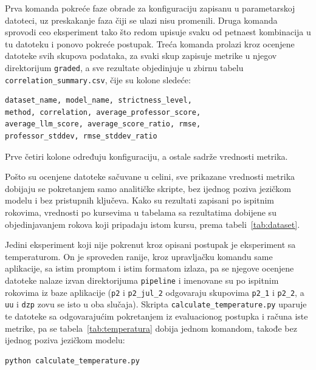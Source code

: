 Prva komanda pokreće faze obrade za konfiguraciju zapisanu u parametarskoj datoteci,
uz preskakanje faza čiji se ulazi nisu promenili.
Druga komanda sprovodi ceo eksperiment tako što redom upisuje
svaku od petnaest kombinacija u tu datoteku i ponovo pokreće postupak.
Treća komanda prolazi kroz ocenjene datoteke svih skupova podataka,
za svaki skup zapisuje metrike u njegov direktorijum \texttt{graded},
a sve rezultate objedinjuje u zbirnu tabelu \texttt{correlation\_summary.csv},
čije su kolone sledeće:

\begin{tcolorbox}[promptbox, title={Kolone zbirne tabele}]
\begin{verbatim}
dataset_name, model_name, strictness_level,
method, correlation, average_professor_score,
average_llm_score, average_score_ratio, rmse,
professor_stddev, rmse_stddev_ratio
\end{verbatim}
\end{tcolorbox}

Prve četiri kolone određuju konfiguraciju, a ostale sadrže vrednosti metrika.

Pošto su ocenjene datoteke sačuvane u celini,
sve prikazane vrednosti metrika dobijaju se pokretanjem samo analitičke skripte,
bez ijednog poziva jezičkom modelu i bez pristupnih ključeva.
Kako su rezultati zapisani po ispitnim rokovima,
vrednosti po kursevima u tabelama sa rezultatima
dobijene su objedinjavanjem rokova koji pripadaju istom kursu,
prema tabeli~\ref{tab:dataset}.

Jedini eksperiment koji nije pokrenut kroz opisani postupak je eksperiment sa temperaturom.
On je sproveden ranije, kroz upravljačku komandu same aplikacije,
sa istim promptom i istim formatom izlaza,
pa se njegove ocenjene datoteke nalaze izvan direktorijuma \texttt{pipeline}
i imenovane su po ispitnim rokovima iz baze aplikacije
(\texttt{p2} i \texttt{p2\_jul\_2} odgovaraju skupovima \texttt{p2\_1} i \texttt{p2\_2},
a \texttt{uu} i \texttt{dzp} zovu se isto u oba slučaja).
Skripta \texttt{calculate\_temperature.py} uparuje te datoteke sa odgovarajućim
pokretanjem iz evaluacionog postupka i računa iste metrike,
pa se tabela~\ref{tab:temperatura} dobija jednom komandom, takođe bez ijednog poziva jezičkom modelu:

\begin{tcolorbox}[promptbox, title={Reprodukcija eksperimenta sa temperaturom}]
\begin{verbatim}
python calculate_temperature.py
\end{verbatim}
\end{tcolorbox}

